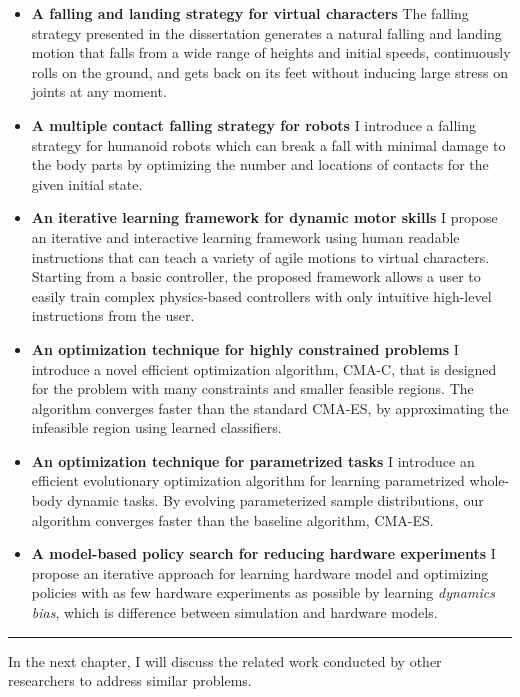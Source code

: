 \begin{itemize}
\item \textbf{A falling and landing strategy for virtual characters}
  The falling strategy presented in the dissertation generates a natural falling
  and landing motion that falls from a wide range of heights and initial
  speeds, continuously rolls on the ground, and gets back on its feet without
  inducing large stress on joints at any moment.
\item \textbf{A multiple contact falling strategy for robots}
  I introduce a falling strategy for humanoid robots which can break a
  fall with minimal damage to the body parts by optimizing the number and
  locations of contacts for the given initial state. 
\item \textbf{An iterative learning framework for dynamic motor skills}
  I propose an iterative and interactive learning framework 
  using human readable instructions that can teach a variety of agile motions
  to virtual characters.
  Starting from a basic controller, the proposed framework allows a user 
  to easily train complex physics-based controllers 
  with only intuitive high-level instructions from the user.
\item \textbf{An optimization technique for highly constrained problems}
  I introduce a novel efficient optimization algorithm, CMA-C, that is 
  designed for the problem with many constraints and smaller feasible regions.
  The algorithm converges faster than the standard CMA-ES,
  by approximating the infeasible region using learned classifiers.
\item \textbf{An optimization technique for parametrized tasks}
  I introduce an efficient evolutionary optimization algorithm for learning
  parametrized whole-body dynamic tasks.
  By evolving parameterized sample distributions, our algorithm
  converges faster than the baseline algorithm, CMA-ES.
\item \textbf{A model-based policy search for reducing hardware experiments}
  I propose an iterative approach for learning hardware model and optimizing
  policies with as few hardware experiments as possible by learning
  \emph{dynamics bias}, which is difference between simulation and hardware
  models. 
\end{itemize}

\rule{0.95\textwidth}{1pt}

In the next chapter, I will discuss the related work conducted by other
researchers to address similar problems.

